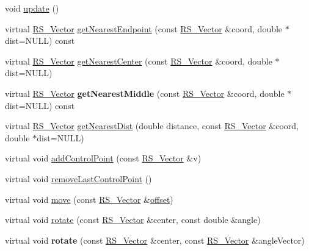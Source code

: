 \begin{DoxyCompactItemize}
\item 
void \hyperlink{classRS__Spline_a92830157f9485cfd15ac20b049cb25e3}{update} ()
\item 
virtual \hyperlink{classRS__Vector}{R\-S\-\_\-\-Vector} \hyperlink{classRS__Spline_a0c6ea06a65c7b637ce82a11ce8508db8}{get\-Nearest\-Endpoint} (const \hyperlink{classRS__Vector}{R\-S\-\_\-\-Vector} \&coord, double $\ast$dist=N\-U\-L\-L) const 
\item 
virtual \hyperlink{classRS__Vector}{R\-S\-\_\-\-Vector} \hyperlink{classRS__Spline_a23d25f1a892f9f72b90daec6ce627a78}{get\-Nearest\-Center} (const \hyperlink{classRS__Vector}{R\-S\-\_\-\-Vector} \&coord, double $\ast$dist=N\-U\-L\-L)
\item 
\hypertarget{classRS__Spline_a4722ec889ce70dcd77935b4e71f14a85}{virtual \hyperlink{classRS__Vector}{R\-S\-\_\-\-Vector} {\bfseries get\-Nearest\-Middle} (const \hyperlink{classRS__Vector}{R\-S\-\_\-\-Vector} \&coord, double $\ast$dist=N\-U\-L\-L) const }\label{classRS__Spline_a4722ec889ce70dcd77935b4e71f14a85}

\item 
virtual \hyperlink{classRS__Vector}{R\-S\-\_\-\-Vector} \hyperlink{classRS__Spline_a2624a79ab3e49d33ccaf9ae05cc78198}{get\-Nearest\-Dist} (double distance, const \hyperlink{classRS__Vector}{R\-S\-\_\-\-Vector} \&coord, double $\ast$dist=N\-U\-L\-L)
\item 
virtual void \hyperlink{classRS__Spline_a2f2d3a6339d243019e19c14361dd6fd8}{add\-Control\-Point} (const \hyperlink{classRS__Vector}{R\-S\-\_\-\-Vector} \&v)
\item 
virtual void \hyperlink{classRS__Spline_a07278c2c17681195a035bb597a01dea0}{remove\-Last\-Control\-Point} ()
\item 
virtual void \hyperlink{classRS__Spline_af7b7f227408c82d53fe48243f601bee5}{move} (const \hyperlink{classRS__Vector}{R\-S\-\_\-\-Vector} \&\hyperlink{classRS__Entity_aa296d21b9aac99161d386ce2f60f0fea}{offset})
\item 
virtual void \hyperlink{classRS__Spline_ac9811a626db113c0d33e94a011d01381}{rotate} (const \hyperlink{classRS__Vector}{R\-S\-\_\-\-Vector} \&center, const double \&angle)
\item 
\hypertarget{classRS__Spline_ad204ee709de5324b689736d8ee74fb7a}{virtual void {\bfseries rotate} (const \hyperlink{classRS__Vector}{R\-S\-\_\-\-Vector} \&center, const \hyperlink{classRS__Vector}{R\-S\-\_\-\-Vector} \&angle\-Vector)}\label{classRS__Spline_ad204ee709de5324b689736d8ee74fb7a}


\end{DoxyCompactItemize}
